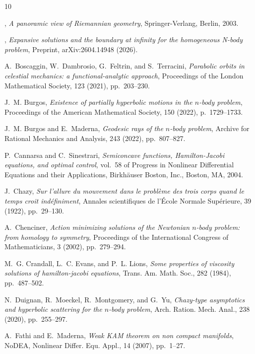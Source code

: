 \documentclass[a4paper,10pt]{amsart}
\theoremstyle{plain}
\theoremstyle{definition}
\numberwithin{equation}{section}
\numberwithin{thm}{section}
\begin{document}
\begin{thebibliography}{10}

    , {\em A panoramic view of Riemannian geometry}, Springer-Verlang, Berlin, 2003.

, 
{\em Expansive solutions and the boundary at infinity for the homogeneous N-body problem},
Preprint, arXiv:2604.14948 (2026).

{\sc A.~Boscaggin, W.~Dambrosio, G.~Feltrin, and S.~Terracini}, {\em Parabolic
  orbits in celestial mechanics: a functional-analytic approach}, Proceedings
  of the London Mathematical Society, 123 (2021), pp.~203--230.

{\sc J.~M. Burgos}, {\em Existence of partially hyperbolic motions in the
  $n$-body problem}, Proceedings of the American Mathematical Society, 150
  (2022), p.~1729–1733.

{\sc J.~M. Burgos and E.~Maderna}, {\em Geodesic rays of the $n$-body problem},
  Archive for Rational Mechanics and Analysis, 243 (2022), pp.~807--827.

{\sc P.~Cannarsa and C.~Sinestrari}, {\em Semiconcave functions,
  {H}amilton-{J}acobi equations, and optimal control}, vol.~58 of Progress in
  Nonlinear Differential Equations and their Applications, Birkh\"{a}user
  Boston, Inc., Boston, MA, 2004.

{\sc J.~Chazy}, {\em Sur l'allure du mouvement dans le problème des trois
  corps quand le temps croit indéfiniment}, Annales scientifiques de l'École
  Normale Supérieure, 39 (1922), pp.~29--130.

{\sc A.~Chenciner}, {\em Action minimizing solutions of the {N}ewtonian
  $n$-body problem: from homology to symmetry}, Proceedings of the
  International Congress of Mathematicians, 3 (2002), pp.~279--294.

{\sc M.~G. Crandall, L.~C. Evans, and P.~L. Lions}, {\em Some properties of
  viscosity solutions of hamilton-jacobi equations}, Trans. Am. Math. Soc., 282
  (1984), pp.~487--502.

{\sc N.~Duignan, R.~Moeckel, R.~Montgomery, and G.~Yu}, {\em Chazy-type
  asymptotics and hyperbolic scattering for the {$n$}-body problem}, Arch.
  Ration. Mech. Anal., 238 (2020), pp.~255--297.

{\sc A.~Fathi and E.~Maderna}, {\em Weak {KAM} theorem on non compact
  manifolds}, NoDEA, Nonlinear Differ. Equ. Appl., 14 (2007), pp.~1--27.


\end{thebibliography}
\end{document}
